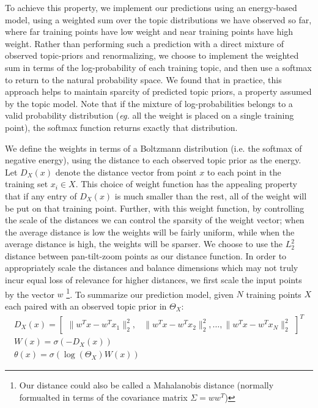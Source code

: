 To achieve this property, we implement our predictions using an energy-based model, using a weighted sum over the topic distributions we have observed so far, where far training points have low weight and near training points have high weight. Rather than performing such a prediction with a direct mixture of observed topic-priors and renormalizing, we choose to implement the weighted sum in terms of the log-probability of each training topic, and then use a softmax to return to the natural probability space. We found that in practice, this approach helps to maintain sparcity of predicted topic priors, a property assumed by the topic model. Note that if the mixture of log-probabilities belongs to a valid probability distribution (\emph{eg.} all the weight is placed on a single training point), the softmax function returns exactly that distribution.

We define the weights in terms of a Boltzmann distribution (i.e. the softmax of negative energy), using the distance to each observed topic prior as the energy. Let $D_X(x)$ denote the distance vector from point $x$ to each point in the training set $x_i \in X$. This choice of weight function has the appealing property that if any entry of $D_X(x)$ is much smaller than the rest, all of the weight will be put on that training point. Further, with this weight function, by controlling the scale of the distances we can control the sparsity of the weight vector; when the average distance is low the weights will be fairly uniform, while when the average distance is high, the weights will be sparser. We choose to use the $\mathit{L}_2^2$ distance between pan-tilt-zoom points as our distance function. In order to appropriately scale the distances and balance dimensions which may not truly incur equal loss of relevance for higher distances, we first scale the input points by the vector $w$ \footnote{Our distance could also be called a Mahalanobis distance (normally formualted in terms of the covariance matrix $\Sigma = ww^T$)}. To summarize our prediction model, given $N$ training points $X$ each paired with an observed topic prior in $\Theta_X$:
\begin{equation}
\begin{split}
    D_X(x) = 
    \begin{bmatrix}
    \|w^Tx - w^T x_1 \|_2^2, & \|w^Tx - w^T x_2 \|_2^2, \ldots, \|w^Tx - w^T x_N \|_2^2
    \end{bmatrix}^T\\
    W(x) = \sigma \left( -D_{X}(x) \right)\\
    \theta(x) = \sigma \left( \log \left(\Theta_X \right) W(x) \right)
\end{split}
\end{equation}

